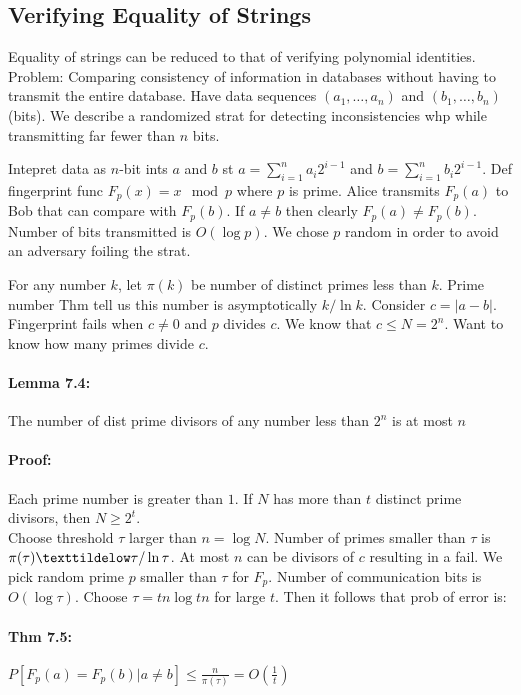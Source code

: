 \documentclass[a4paper]{article}
\begin{document}
\subsection{Verifying Equality of Strings}
\label{sub:Verifying Equality of Strings}
Equality of strings can be reduced to that of verifying polynomial identities.\\
Problem: Comparing consistency of information in databases without having to transmit the entire database. Have data sequences $(a_1,\ldots,a_n)$ and $(b_1,\ldots,b_n)$ (bits). We describe a randomized strat for detecting inconsistencies whp while transmitting far fewer than $n$ bits.

Intepret data as $n$-bit ints $a$ and $b$ st $a=\sum^{n}_{i=1} a_i2^{i-1}$ and $b=\sum^{n}_{i=1} b_i2^{i-1}$. Def fingerprint func $F_p(x)=x \mod p$ where $p$ is prime. Alice transmits $F_p(a)$ to Bob that can compare with $F_p(b)$. If $a\not = b$ then clearly $F_p(a)\not =F_p(b)$. Number of bits transmitted is $O(\log p)$. We chose $p$ random in order to avoid an adversary foiling the strat.

For any number $k$, let $\pi(k)$ be number of distinct primes less than $k$. Prime number Thm tell us this number is asymptotically $k/\ln k$. Consider $c=|a-b|$. Fingerprint fails when $c\not = 0$ and $p$ divides $c$. We know that $c\leq N=2^n$. Want to know how many primes divide $c$.
\paragraph{Lemma 7.4:} The number of dist prime divisors of any number less than $2^n$ is at most $n$
\paragraph{Proof:} Each prime number is greater than $1$. If $N$ has more than $t$ distinct prime divisors, then $N\geq 2^t$.\\

Choose threshold $\tau$ larger than $n=\log N$. Number of primes smaller than $\tau$ is $\pi(\tau)\texttildelow \tau/\ln \tau$. At most $n$ can be divisors of $c$ resulting in a fail. We pick random prime $p$ smaller than $\tau$ for $F_p$. Number of communication bits is $O(\log \tau)$. Choose $\tau=tn\log tn$ for large $t$. Then it follows that prob of error is:
\paragraph{Thm 7.5:} $P[F_p(a)=F_p(b)|a\not = b]\leq \frac{n}{\pi(\tau)}=O\left( \frac{1}{t} \right)$
\end{document}
